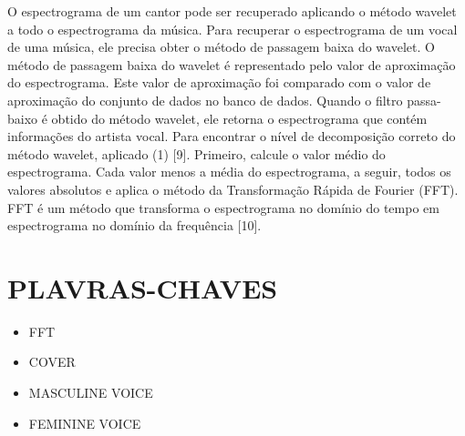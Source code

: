 \documentclass{article}
\begin{document}
O espectrograma de um cantor pode ser recuperado aplicando o método wavelet a todo o espectrograma da música. Para recuperar o espectrograma de um vocal de uma música, ele precisa obter o método de passagem baixa do wavelet. O método de passagem baixa do wavelet é representado pelo valor de aproximação do espectrograma. Este valor de aproximação foi comparado com o valor de aproximação do conjunto de dados no banco de dados.
Quando o filtro passa-baixo é obtido do método wavelet, ele retorna o espectrograma que contém informações do artista vocal.
Para encontrar o nível de decomposição correto do método wavelet, aplicado (1) [9]. Primeiro, calcule o valor médio do espectrograma. Cada valor menos a média do espectrograma, a seguir, todos os valores absolutos e aplica o método da Transformação Rápida de Fourier (FFT). FFT é um método que transforma o espectrograma no domínio do tempo em espectrograma no domínio da frequência [10].
\section{PLAVRAS-CHAVES}
\begin{itemize}
    \item FFT
    \item COVER 
    \item MASCULINE VOICE
    \item FEMININE VOICE
\end{itemize}
\end{document}
